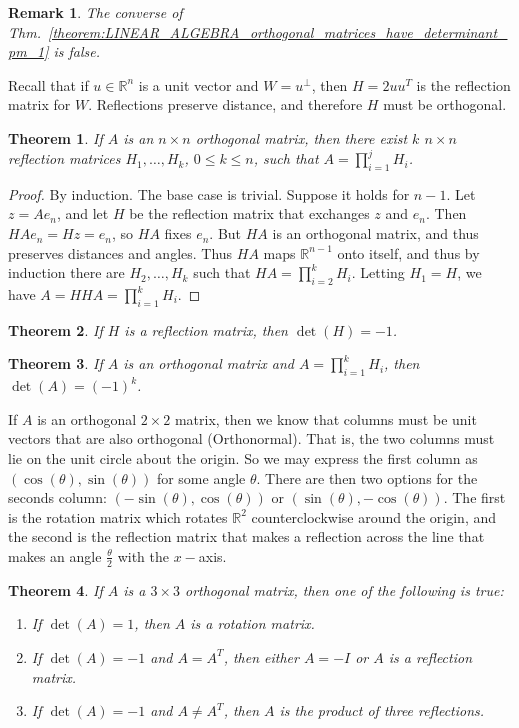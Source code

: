 \documentclass[oneside]{book}
\theoremstyle{mystyle}
\newtheorem{theorem}{Theorem}[section]
\newtheorem{remark}{Remark}[section]
\begin{document}
\begin{remark}
The converse of Thm.~\ref{theorem:LINEAR_ALGEBRA_orthogonal_matrices_have_determinant_pm_1} is false.
\end{remark}
Recall that if $u\in \mathbb{R}^n$ is a unit vector and $W = u^{\perp}$, then $H=2uu^T$ is the reflection matrix for $W$. Reflections preserve distance, and therefore $H$ must be orthogonal.
\begin{theorem}
If $A$ is an $n\times n$ orthogonal matrix, then there exist $k$ $n\times n$ reflection matrices $H_1,\hdots, H_k$, $0\leq k \leq n$, such that $A = \prod_{i=1}^{j}H_i$.
\end{theorem}
\begin{proof}
By induction. The base case is trivial. Suppose it holds for $n-1$. Let $z = Ae_n$, and let $H$ be the reflection matrix that exchanges $z$ and $e_n$. Then $HAe_n = Hz = e_n$, so $HA$ fixes $e_n$. But $HA$ is an orthogonal matrix, and thus preserves distances and angles. Thus $HA$ maps $\mathbb{R}^{n-1}$ onto itself, and thus by induction there are $H_2,\hdots, H_k$ such that $HA = \prod_{i=2}^{k} H_i$. Letting $H_{1}=H$, we have $A = HHA = \prod_{i=1}^{k}H_i$.
\end{proof}
\begin{theorem}
If $H$ is a reflection matrix, then $\det(H) = -1$.
\end{theorem}
\begin{theorem}
If $A$ is an orthogonal matrix and $A=\prod_{i=1}^{k} H_i$, then $\det(A) = (-1)^k$.
\end{theorem}
If $A$ is an orthogonal $2\times 2$ matrix, then we know that columns must be unit vectors that are also orthogonal (Orthonormal). That is, the two columns must lie on the unit circle about the origin. So we may express the first column as $(\cos(\theta),\sin(\theta))$ for some angle $\theta$. There are then two options for the seconds column: $(-\sin(\theta),\cos(\theta))$ or $(\sin(\theta),-\cos(\theta))$. The first is the rotation matrix which rotates $\mathbb{R}^2$ counterclockwise around the origin, and the second is the reflection matrix that makes a reflection across the line that makes an angle $\frac{\theta}{2}$ with the $x-$axis. 
\begin{theorem}
If $A$ is a $3\times 3$ orthogonal matrix, then one of the following is true:
\begin{enumerate}[itemsep=0pt]
\item If $\det(A) = 1$, then $A$ is a rotation matrix.
\item If $\det(A) = -1$ and $A=A^T$, then either $A=-I$ or $A$ is a reflection matrix.
\item If $\det(A) = -1$ and $A\ne A^T$, then $A$ is the product of three reflections.
\end{enumerate}
\end{theorem}
\end{document}
